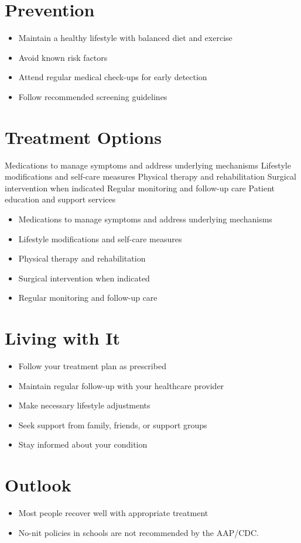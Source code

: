 \section{Prevention}
\begin{itemize}[noitemsep]
  \item Maintain a healthy lifestyle with balanced diet and exercise
  \item Avoid known risk factors
  \item Attend regular medical check-ups for early detection
  \item Follow recommended screening guidelines
\end{itemize}
\section{Treatment Options}
Medications to manage symptoms and address underlying mechanisms Lifestyle modifications and self-care measures Physical therapy and rehabilitation Surgical intervention when indicated Regular monitoring and follow-up care Patient education and support services

\begin{itemize}[noitemsep]
  \item Medications to manage symptoms and address underlying mechanisms
  \item Lifestyle modifications and self-care measures
  \item Physical therapy and rehabilitation
  \item Surgical intervention when indicated
  \item Regular monitoring and follow-up care
\end{itemize}
\section{Living with It}
\begin{itemize}[noitemsep]
  \item Follow your treatment plan as prescribed
  \item Maintain regular follow-up with your healthcare provider
  \item Make necessary lifestyle adjustments
  \item Seek support from family, friends, or support groups
  \item Stay informed about your condition
\end{itemize}
\section{Outlook}
\begin{itemize}[noitemsep]
  \item Most people recover well with appropriate treatment
  \item No-nit policies in schools are not recommended by the AAP/CDC.
\end{itemize}
